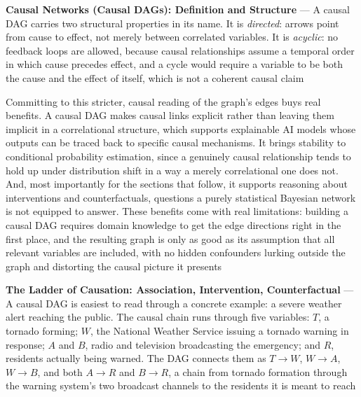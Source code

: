 \textbf{Causal Networks (Causal DAGs): Definition and Structure} --- A
causal DAG carries two structural properties in its name. It is
\emph{directed}: arrows point from cause to effect, not merely between
correlated variables. It is \emph{acyclic}: no feedback loops are allowed,
because causal relationships assume a temporal order in which cause
precedes effect, and a cycle would require a variable to be both the cause
and the effect of itself, which is not a coherent causal claim

Committing to this stricter, causal reading of the graph's edges buys real
benefits. A causal DAG makes causal links explicit rather than leaving them
implicit in a correlational structure, which supports explainable AI models
whose outputs can be traced back to specific causal mechanisms. It brings
stability to conditional probability estimation, since a genuinely causal
relationship tends to hold up under distribution shift in a way a merely
correlational one does not. And, most importantly for the sections that
follow, it supports reasoning about interventions and counterfactuals,
questions a purely statistical Bayesian network is not equipped to answer.
These benefits come with real limitations: building a causal DAG requires
domain knowledge to get the edge directions right in the first place, and
the resulting graph is only as good as its assumption that all relevant
variables are included, with no hidden confounders lurking outside the
graph and distorting the causal picture it presents

\textbf{The Ladder of Causation: Association, Intervention, Counterfactual}
--- A causal DAG is easiest to read through a concrete example: a severe
weather alert reaching the public. The causal chain runs through five
variables: $T$, a tornado forming; $W$, the National Weather Service
issuing a tornado warning in response; $A$ and $B$, radio and television
broadcasting the emergency; and $R$, residents actually being warned. The
DAG connects them as $T \to W$, $W \to A$, $W \to B$, and both $A \to R$ and
$B \to R$, a chain from tornado formation through the warning system's two
broadcast channels to the residents it is meant to reach

